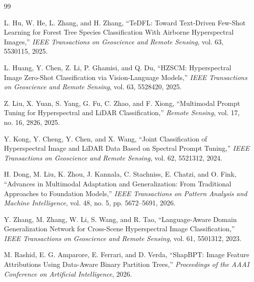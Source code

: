 \documentclass[10pt,journal,compsoc]{IEEEtran}
\begin{document}
\begin{thebibliography}{99}

L. Hu, W. He, L. Zhang, and H. Zhang, ``TeDFL: Toward Text-Driven Few-Shot Learning for Forest Tree Species Classification With Airborne Hyperspectral Images,'' \textit{IEEE Transactions on Geoscience and Remote Sensing}, vol. 63, 5530115, 2025.

L. Huang, Y. Chen, Z. Li, P. Ghamisi, and Q. Du, ``HZSCM: Hyperspectral Image Zero-Shot Classification via Vision-Language Models,'' \textit{IEEE Transactions on Geoscience and Remote Sensing}, vol. 63, 5528420, 2025.

Z. Liu, X. Yuan, S. Yang, G. Fu, C. Zhao, and F. Xiong, ``Multimodal Prompt Tuning for Hyperspectral and LiDAR Classification,'' \textit{Remote Sensing}, vol. 17, no. 16, 2826, 2025.

Y. Kong, Y. Cheng, Y. Chen, and X. Wang, ``Joint Classification of Hyperspectral Image and LiDAR Data Based on Spectral Prompt Tuning,'' \textit{IEEE Transactions on Geoscience and Remote Sensing}, vol. 62, 5521312, 2024.

H. Dong, M. Liu, K. Zhou, J. Kannala, C. Stachniss, E. Chatzi, and O. Fink, ``Advances in Multimodal Adaptation and Generalization: From Traditional Approaches to Foundation Models,'' \textit{IEEE Transactions on Pattern Analysis and Machine Intelligence}, vol. 48, no. 5, pp. 5672--5691, 2026.

Y. Zhang, M. Zhang, W. Li, S. Wang, and R. Tao, ``Language-Aware Domain Generalization Network for Cross-Scene Hyperspectral Image Classification,'' \textit{IEEE Transactions on Geoscience and Remote Sensing}, vol. 61, 5501312, 2023.

M. Rashid, E. G. Amparore, E. Ferrari, and D. Verda, ``ShapBPT: Image Feature Attributions Using Data-Aware Binary Partition Trees,'' \textit{Proceedings of the AAAI Conference on Artificial Intelligence}, 2026.

\end{thebibliography}
\end{document}
